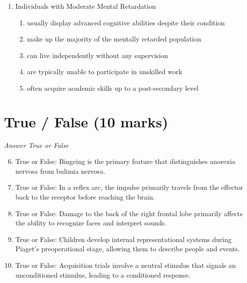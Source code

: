 \documentclass[12pt]{article}
\begin{document}
\begin{enumerate}[label=\arabic*.]
examinees into high- and low-performing groups:
\begin{enumerate}[label=(\alph*)]
    \item 0
    \item 0.5
    \item 0.8
    \item 0.3
    \item 1.2
\end{enumerate}
\item Individuals with Moderate Mental Retardation
\begin{enumerate}[label=(\alph*)]
    \item usually display advanced cognitive abilities despite their condition
    \item make up the majority of the mentally retarded population
    \item can live independently without any supervision
    \item are typically unable to participate in unskilled work
    \item often acquire academic skills up to a post-secondary level
\end{enumerate}
\end{enumerate}

\section*{True / False (10 marks)}
\textit{Answer True or False}
\begin{enumerate}[label=\arabic*.]
\setcounter{enumi}{5}
\item True or False: Bingeing is the primary feature that distinguishes anorexia nervosa from bulimia nervosa.
\item True or False: In a reflex arc, the impulse primarily travels from the effector back to the receptor before reaching the brain.
\item True or False: Damage to the back of the right frontal lobe primarily affects the ability to recognize faces and interpret sounds.
\item True or False: Children develop internal representational systems during Piaget's preoperational stage, allowing them to describe people and events.
\item True or False: Acquisition trials involve a neutral stimulus that signals an unconditioned stimulus, leading to a conditioned response.
\end{enumerate}
\end{document}

